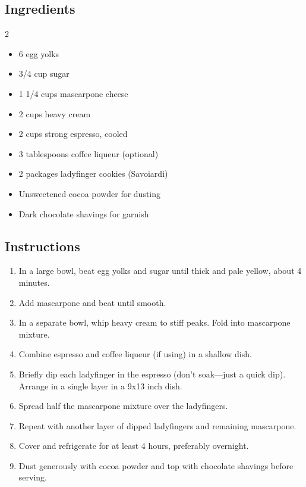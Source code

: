\documentclass[
    language=english,
    doctype=recipe-book,
    institution=none,
]{../../omnilatex}
\begin{document}
\subsection*{Ingredients}

\begin{multicols}{2}
\begin{itemize}[leftmargin=*]
    \item 6 egg yolks
    \item 3/4 cup sugar
    \item 1 1/4 cups mascarpone cheese
    \item 2 cups heavy cream
    \item 2 cups strong espresso, cooled
    \item 3 tablespoons coffee liqueur (optional)
    \item 2 packages ladyfinger cookies (Savoiardi)
    \item Unsweetened cocoa powder for dusting
    \item Dark chocolate shavings for garnish
\end{itemize}
\end{multicols}

\subsection*{Instructions}

\begin{enumerate}
    \item In a large bowl, beat egg yolks and sugar until thick and pale yellow, about 4 minutes.
    \item Add mascarpone and beat until smooth.
    \item In a separate bowl, whip heavy cream to stiff peaks. Fold into mascarpone mixture.
    \item Combine espresso and coffee liqueur (if using) in a shallow dish.
    \item Briefly dip each ladyfinger in the espresso (don't soak---just a quick dip). Arrange in a single layer in a 9x13 inch dish.
    \item Spread half the mascarpone mixture over the ladyfingers.
    \item Repeat with another layer of dipped ladyfingers and remaining mascarpone.
    \item Cover and refrigerate for at least 4 hours, preferably overnight.
    \item Dust generously with cocoa powder and top with chocolate shavings before serving.
\end{enumerate}
\end{document}
